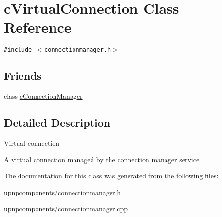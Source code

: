 \hypertarget{classcVirtualConnection}{
\section{cVirtualConnection Class Reference}
\label{classcVirtualConnection}
}
{\tt \#include $<$connectionmanager.h$>$}

\subsection*{Friends}
\begin{CompactItemize}
\item 
\hypertarget{classcVirtualConnection_a889c1ce7880be8fb32bbd69a95b1915}{
class \hyperlink{classcVirtualConnection_a889c1ce7880be8fb32bbd69a95b1915}{cConnectionManager}}
\label{classcVirtualConnection_a889c1ce7880be8fb32bbd69a95b1915}

\end{CompactItemize}


\subsection{Detailed Description}
Virtual connection

A virtual connection managed by the connection manager service 

The documentation for this class was generated from the following files:\begin{CompactItemize}
\item 
upnpcomponents/connectionmanager.h\item 
upnpcomponents/connectionmanager.cpp\end{CompactItemize}
